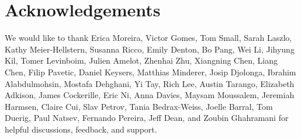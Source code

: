 \documentclass{article}
\begin{document}
\section*{Acknowledgements} 
We would like to thank Erica Moreira, Victor Gomes, Tom Small, Sarah Laszlo, 
Kathy Meier-Hellstern, Susanna Ricco, Emily Denton, Bo Pang, Wei Li, Jihyung Kil, Tomer Levinboim, Julien Amelot, Zhenhai Zhu, Xiangning Chen, Liang Chen, Filip Pavetic, Daniel Keysers, Matthias Minderer, Josip Djolonga, Ibrahim Alabdulmohsin, Mostafa Dehghani, Yi Tay, Rich Lee, Austin Tarango, Elizabeth Adkison, James Cockerille, Eric Ni, Anna Davies, Maysam Moussalem, Jeremiah Harmsen, Claire Cui, Slav Petrov, Tania Bedrax-Weiss, Joelle Barral, Tom Duerig, Paul Natsev, Fernando Pereira, Jeff Dean, and Zoubin Ghahramani for helpful discussions, feedback, and support.



\clearpage

\appendix

\end{document}
